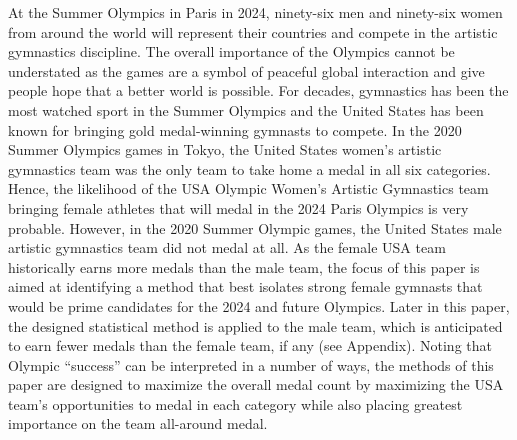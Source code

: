 \documentclass[12pt]{article}
\begin{document}
At the Summer Olympics in Paris in 2024, ninety-six men and ninety-six women from around the world will 
represent their countries and compete in the artistic gymnastics discipline. The overall importance of the Olympics 
cannot be understated as the games are a symbol of peaceful global interaction and give people hope that a better 
world is possible. For decades, gymnastics has been the most watched sport in the Summer Olympics and the United 
States has been known for bringing gold medal-winning gymnasts to compete. In the 2020 
Summer Olympics games in Tokyo, the United States women's artistic gymnastics team was the only team to take 
home a medal in all six categories. Hence, the likelihood of the USA Olympic Women’s Artistic Gymnastics 
team bringing female athletes that will medal in the 2024 Paris Olympics is very probable. 
However, in the 2020 Summer Olympic games, the United States 
male artistic gymnastics team did not medal at all. As the female USA team historically earns more medals than 
the male team, the focus of this paper is aimed at identifying a method that best isolates strong female gymnasts 
that would be prime candidates for the 2024 and future Olympics. Later in this paper, the designed statistical 
method is applied to the male team, which is anticipated to earn fewer medals than the female team, if any 
(see Appendix). Noting that Olympic ``success'' can be interpreted in a number of ways, the methods of this 
paper are designed to maximize the overall medal count by maximizing the USA team's opportunities to medal in each 
category while also placing greatest importance on the team all-around medal. 
\end{document}
